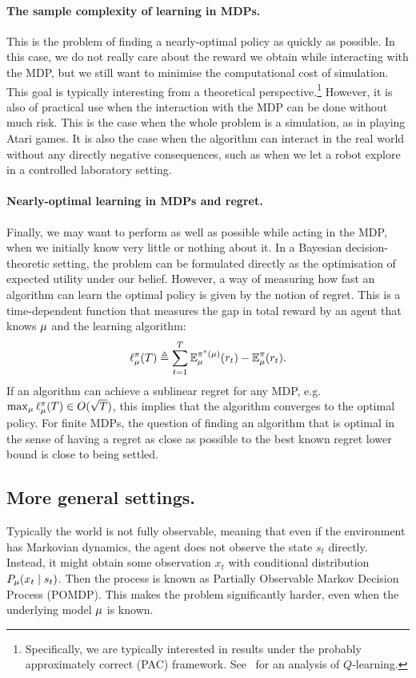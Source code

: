 \paragraph{The sample complexity of learning in MDPs.}
This is the problem of finding a nearly-optimal policy as quickly as possible. In this case, we do not really care about the reward we obtain while interacting with the MDP, but we still want to minimise the computational cost of simulation. This goal is typically interesting from a theoretical perspective.\footnote{Specifically, we are typically interested in results under the probably approximately correct (PAC) framework. See~\citet{nips:kearns:1999} for an analysis of $Q$-learning.} However, it is also of practical use when the interaction with the MDP can be done without much risk. This is the case when the whole problem is a simulation, as in playing Atari games. It is also the case when the algorithm can interact in the real world without any directly negative consequences, such as when we let a robot explore in a controlled laboratory setting.

\paragraph{Nearly-optimal learning in MDPs and regret.}
Finally, we may want to perform as well as possible while acting in the MDP, when we initially know very little or nothing about it. In a Bayesian decision-theoretic setting, the problem can be formulated directly as the optimisation of expected utility under our belief. However, a way of measuring how fast an algorithm can learn the optimal policy is given by the notion of regret. This is a time-dependent function that measures the gap in total reward by an agent that knows $\mu$ and the learning algorithm:
\[
\ell_\mu^\pi(T) \mathrel{\triangleq} \sum_{t=1}^T \mathop{\mbox{\ensuremath{\mathbb{E}}}}\nolimits_\mu^{\pi^*(\mu)} (r_t) - \mathop{\mbox{\ensuremath{\mathbb{E}}}}\nolimits_\mu^{\pi} (r_t).
\]
If an algorithm can achieve a sublinear regret for any MDP, e.g. $\max_\mu \ell_\mu^\pi(T) \in O(\sqrt{T})$, this implies that the algorithm converges to the optimal policy. For finite MDPs, the question of finding an algorithm that is optimal in the sense of having a regret as close as possible to the best known regret lower bound is close to being settled.

\subsection{More general settings.}

Typically the world is not fully observable, meaning that even if the environment has Markovian dynamics, the agent does not observe the state $s_t$ directly. Instead, it might obtain some observation $x_t$ with conditional distribution $P_\mu(x_t \mid s_t)$. Then the process is known as Partially Observable Markov Decision Process (POMDP). This makes the problem significantly harder, even when the underlying model $\mu$ is known.

